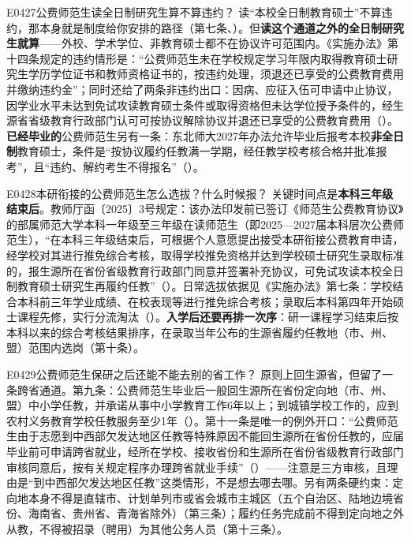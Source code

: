 \begin{qa}{E0427}{公费师范生读全日制研究生算不算违约？}
读“本校全日制教育硕士”不算违约，那本身就是制度给你安排的路径（第七条、）。但\textbf{读这个通道之外的全日制研究生就算}——外校、学术学位、非教育硕士都不在协议许可范围内。《实施办法》第十四条规定的违约情形是：“公费师范生未在学校规定学习年限内取得教育硕士研究生学历学位证书和教师资格证书的，按违约处理，须退还已享受的公费教育费用并缴纳违约金”；同时还给了两条非违约出口：因病、应征入伍可申请中止协议，因学业水平未达到免试攻读教育硕士条件或取得资格但未达学位授予条件的，经生源省省级教育行政部门认可可按协议解除协议并退还已享受的公费教育费用（）。\textbf{已经毕业的}公费师范生另有一条：东北师大2027年办法允许毕业后报考本校\textbf{非全日制}教育硕士，条件是“按协议履约任教满一学期，经任教学校考核合格并批准报考”，且“违约、解约考生不得报名”（）。
\end{qa}

\begin{qa}{E0428}{本研衔接的公费师范生怎么选拔？什么时候报？}
关键时间点是\textbf{本科三年级结束后}。教师厅函〔2025〕3号规定：该办法印发前已签订《师范生公费教育协议》的部属师范大学本科一年级至三年级在读师范生（即2025—2027届本科层次公费师范生），“在本科三年级结束后，可根据个人意愿提出接受本研衔接公费教育申请，经学校对其进行推免综合考核，取得学校推免资格并达到学校硕士研究生录取标准的，报生源所在省份省级教育行政部门同意并签署补充协议，可免试攻读本校全日制教育硕士研究生再履约任教”（）。日常选拔依据见《实施办法》第七条：学校结合本科前三年学业成绩、在校表现等进行推免综合考核；录取后本科第四年开始硕士课程先修，实行分流淘汰（）。\textbf{入学后还要再排一次序}：研一课程学习结束后按本科以来的综合考核结果排序，在录取当年公布的生源省履约任教地（市、州、盟）范围内选岗（第十条）。
\end{qa}

\begin{qa}{E0429}{公费师范生保研之后还能不能去别的省工作？}
原则上回生源省，但留了一条跨省通道。第九条：公费师范生毕业后一般回生源所在省份定向地（市、州、盟）中小学任教，并承诺从事中小学教育工作6年以上；到城镇学校工作的，应到农村义务教育学校任教服务至少1年（）。第十一条是唯一的例外开口：“公费师范生由于志愿到中西部欠发达地区任教等特殊原因不能回生源所在省份任教的，应届毕业前可申请跨省就业，经所在学校、接收省份和生源所在省份省级教育行政部门审核同意后，按有关规定程序办理跨省就业手续”（）——注意是三方审核，且理由是“到中西部欠发达地区任教”这类情形，不是想去哪去哪。另有两条硬约束：定向地本身不得是直辖市、计划单列市或省会城市主城区（五个自治区、陆地边境省份、海南省、贵州省、青海省除外）（第三条）；履约任务完成前不得到定向地之外从教，不得被招录（聘用）为其他公务人员（第十三条）。
\end{qa}

